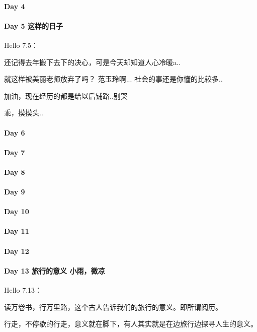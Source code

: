 \documentclass[UTF8,a4paper,8pt]{ctexbook}
\begin{document}
 	 \paragraph{Day 4       \quad     }
 	 \paragraph{Day 5   这样的日子    \quad     }
	 	 Hello 7.5：
	 	 
	 	 还记得去年搬下去下的决心，可是今天却知道人心冷暖a..
	 	 
	 	 就这样被美丽老师放弃了吗？ 范玉玲啊... 社会的事还是你懂的比较多..
	 	 
	 	 加油，现在经历的都是给以后铺路..别哭
	 	 
	 	 乖，摸摸头..
 	 \paragraph{Day 6       \quad     }
 	 \paragraph{Day 7       \quad     }
 	 \paragraph{Day 8       \quad     }
 	 \paragraph{Day 9       \quad     }
 	 \paragraph{Day 10      \quad     }
 	 \paragraph{Day 11      \quad     }
 	 \paragraph{Day 12      \quad     }
 	 \paragraph{Day 13  旅行的意义    \quad   小雨，微凉  }
	 	 Hello 7.13：
	 	 
	 	 读万卷书，行万里路，这个古人告诉我们的旅行的意义。即所谓阅历。
	 	 
	 	 行走，不停歇的行走，意义就在脚下，有人其实就是在边旅行边探寻人生的意义。
	 	 
\end{document}
